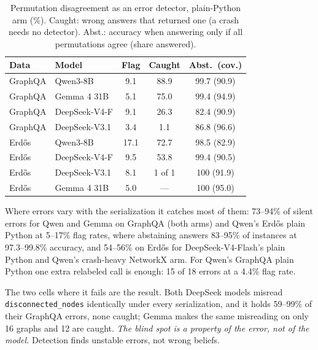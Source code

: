 \documentclass[11pt]{article}
\begin{document}
\begin{table}[t]
\centering\scriptsize
\setlength{\tabcolsep}{5pt}
\begin{tabular}{@{}llccc@{}}
\toprule
Data & Model & Flag & Caught & Abst.\ (cov.) \\
\midrule
GraphQA & Qwen3-8B      & 9.1 & 88.9 & 99.7 (90.9) \\
GraphQA & Gemma 4 31B   & 5.1 & 75.0 & 99.4 (94.9) \\
GraphQA & DeepSeek-V4-F & 9.1 & 26.3 & 82.4 (90.9) \\
GraphQA & DeepSeek-V3.1 & 3.4 & 1.1 & 86.8 (96.6) \\
Erd\H{o}s & Qwen3-8B      & 17.1 & 72.7 & 98.5 (82.9) \\
Erd\H{o}s & DeepSeek-V4-F & 9.5 & 53.8 & 99.4 (90.5) \\
Erd\H{o}s & DeepSeek-V3.1 & 8.1 & 1 of 1 & 100 (91.9) \\
Erd\H{o}s & Gemma 4 31B   & 5.0 & --- & 100 (95.0) \\
\bottomrule
\end{tabular}
\caption{Permutation disagreement as an error detector, plain-Python arm (\%).
Caught: wrong answers that returned one (a crash needs no detector).
Abst.: accuracy when answering only if all permutations agree (share answered).}
\label{tab:detect}
\end{table}

Where errors vary with the serialization it catches most of them: 73--94\% of
silent errors for Qwen and Gemma on GraphQA (both arms) and Qwen's Erd\H{o}s plain
Python at 5--17\% flag rates, where abstaining answers 83--95\% of instances at
97.3--99.8\% accuracy, and 54--56\% on Erd\H{o}s for DeepSeek-V4-Flash's plain
Python and Qwen's crash-heavy NetworkX arm. For Qwen's GraphQA plain Python one extra
relabeled call is enough: 15 of 18 errors at a 4.4\% flag rate.

The two cells where it fails are the result. Both DeepSeek models misread
\texttt{disconnected\_nodes} identically under every serialization, and it holds
59--99\% of their GraphQA errors, none caught; Gemma makes the same misreading on
only 16 graphs and 12 are caught. \emph{The blind spot is a
property of the error, not of the model.} Detection finds unstable errors, not
wrong beliefs.
\end{document}
